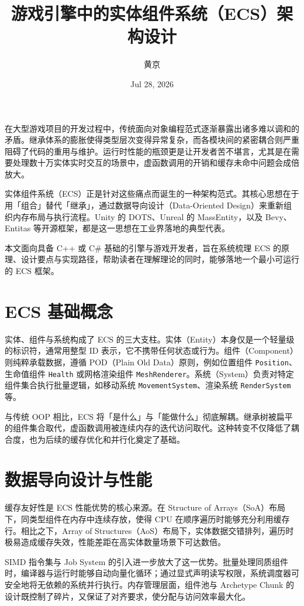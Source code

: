 \title{游戏引擎中的实体组件系统（ECS）架构设计}
\author{黄京}
\date{Jul 28, 2026}
\maketitle
在大型游戏项目的开发过程中，传统面向对象编程范式逐渐暴露出诸多难以调和的矛盾。继承体系的膨胀使得类型层次变得异常复杂，而各模块间的紧密耦合则严重阻碍了代码的重用与维护。运行时性能的瓶颈更是让开发者苦不堪言，尤其是在需要处理数十万实体实时交互的场景中，虚函数调用的开销和缓存未命中问题会成倍放大。\par
实体组件系统（ECS）正是针对这些痛点而诞生的一种架构范式。其核心思想在于用「组合」替代「继承」，通过数据导向设计（Data-Oriented Design）来重新组织内存布局与执行流程。Unity 的 DOTS、Unreal 的 MassEntity，以及 Bevy、Entitas 等开源框架，都是这一思想在工业界落地的典型代表。\par
本文面向具备 C++ 或 C\#{} 基础的引擎与游戏开发者，旨在系统梳理 ECS 的原理、设计要点与实现路径，帮助读者在理解理论的同时，能够落地一个最小可运行的 ECS 框架。\par
\chapter{ECS 基础概念}
实体、组件与系统构成了 ECS 的三大支柱。实体（Entity）本身仅是一个轻量级的标识符，通常用整型 ID 表示，它不携带任何状态或行为。组件（Component）则纯粹承载数据，遵循 POD（Plain Old Data）原则，例如位置组件 \texttt{Position}、生命值组件 \texttt{Health} 或网格渲染组件 \texttt{MeshRenderer}。系统（System）负责对特定组件集合执行批量逻辑，如移动系统 \texttt{MovementSystem}、渲染系统 \texttt{RenderSystem} 等。\par
与传统 OOP 相比，ECS 将「是什么」与「能做什么」彻底解耦。继承树被扁平的组件集合取代，虚函数调用被连续内存的迭代访问取代。这种转变不仅降低了耦合度，也为后续的缓存优化和并行化奠定了基础。\par
\chapter{数据导向设计与性能}
缓存友好性是 ECS 性能优势的核心来源。在 Structure of Arrays（SoA）布局下，同类型组件在内存中连续存放，使得 CPU 在顺序遍历时能够充分利用缓存行。相比之下，Array of Structures（AoS）布局下，实体数据交错排列，遍历时极易造成缓存失效，性能差距在高实体数量场景下可达数倍。\par
SIMD 指令集与 Job System 的引入进一步放大了这一优势。批量处理同质组件时，编译器与运行时能够自动向量化循环；通过显式声明读写权限，系统调度器可安全地将无依赖的系统并行执行。内存管理层面，组件池与 Archetype Chunk 的设计既控制了碎片，又保证了对齐要求，使分配与访问效率最大化。\par
